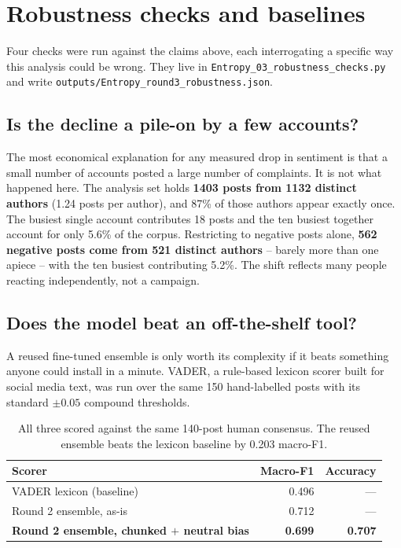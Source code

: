 \documentclass[11pt,a4paper]{article}
\begin{document}
\section{Robustness checks and baselines}

Four checks were run against the claims above, each interrogating a specific way this analysis could be wrong. They live in \texttt{Entropy\_03\_robustness\_checks.py} and write \texttt{outputs/Entropy\_round3\_robustness.json}.

\subsection{Is the decline a pile-on by a few accounts?}

The most economical explanation for any measured drop in sentiment is that a small number of accounts posted a large number of complaints. It is not what happened here. The analysis set holds \textbf{1403 posts from 1132 distinct authors} (1.24 posts per author), and 87\% of those authors appear exactly once. The busiest single account contributes 18 posts and the ten busiest together account for only 5.6\% of the corpus. Restricting to negative posts alone, \textbf{562 negative posts come from 521 distinct authors} -- barely more than one apiece -- with the ten busiest contributing 5.2\%. The shift reflects many people reacting independently, not a campaign.

\subsection{Does the model beat an off-the-shelf tool?}

A reused fine-tuned ensemble is only worth its complexity if it beats something anyone could install in a minute. VADER, a rule-based lexicon scorer built for social media text, was run over the same 150 hand-labelled posts with its standard $\pm 0.05$ compound thresholds.

\begin{table}[H]
\centering\small
\begin{tabular}{@{}lrr@{}}
\toprule
\textbf{Scorer} & \textbf{Macro-F1} & \textbf{Accuracy} \\
\midrule
VADER lexicon (baseline) & 0.496 & --- \\
Round 2 ensemble, as-is & 0.712 & --- \\
\textbf{Round 2 ensemble, chunked $+$ neutral bias} & \textbf{0.699} & \textbf{0.707} \\
\bottomrule
\end{tabular}
\caption{All three scored against the same 140-post human consensus. The reused ensemble beats the lexicon baseline by 0.203 macro-F1.}
\end{table}
\end{document}
